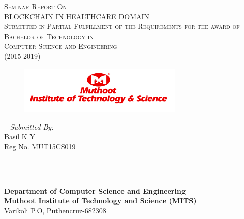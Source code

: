\documentclass[12pt]{report}
\begin{document}
\begin{titlepage}
\center

\textsc{\large Seminar Report On}\\[1.0cm] %
\textsc{\Large BLOCKCHAIN IN HEALTHCARE DOMAIN}\\[1.0cm] %
\textsc{\large Submitted in Partial Fulfillment of the Requirements for the award of \\ Bachelor of Technology in \\ Computer Science and Engineering\\ (2015-2019)}\\[0.5cm] 

\begin{figure}[H]
\centering
\includegraphics[width=0.7\textwidth]{logo.png}\\
\end{figure}

\vspace{2.0cm}
\begin{minipage}{0.4\textwidth}

\center
\
\large
\emph{Submitted By:}\\
\hspace{0.0cm}Basil K Y\\
\hspace{0.0cm}Reg No. MUT15CS019\\
\end{minipage}\\[2cm]
~~~~~~~~~~~~~~~~~~~~


\textbf{Department of Computer Science and Engineering}\\
\textbf{Muthoot Institute of Technology and Science (MITS)} \\
Varikoli P.O, Puthencruz-682308
\end{titlepage}
\end{document}
